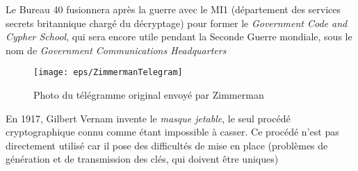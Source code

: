 Le Bureau 40 fusionnera après la guerre avec le MI1 (département des
services secrets britannique chargé du décryptage) pour former le
\emph{Government Code and Cypher School}, qui sera encore utile
pendant la Seconde Guerre mondiale, sous le nom de \emph{Government
  Communications Headquarters} \\

\begin{figure}[h]
  \begin{center}
    \texttt{[image: eps/ZimmermanTelegram]}
  \end{center}
  \caption{Photo du télégramme original envoyé par Zimmerman}
  \label{fig:JeffersonDisk}
\end{figure}

En 1917, Gilbert Vernam invente le \emph{masque jetable}, le
seul procédé cryptographique connu comme étant impossible à casser. Ce
procédé n'est pas directement utilisé car il pose des difficultés de
mise en place (problèmes de génération et de transmission des clés,
qui doivent être uniques) %



